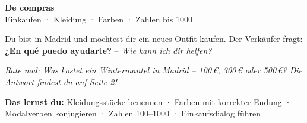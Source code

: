 \documentclass[11pt, a4paper]{article}
\newcommand{\seriftext}[1]{{\fontfamily{ppl}\selectfont #1}}
\newcommand{\es}[1]{\seriftext{\textbf{#1}}}
\newcommand{\de}[1]{\textit{\textcolor{akzent}{#1}}}
\begin{document}
\begin{center}
    {\LARGE\bfseries De compras}\\[3pt]
    {\small Einkaufen · Kleidung · Farben · Zahlen bis 1000}
\end{center}

\vspace{4pt}

Du bist in Madrid und möchtest dir ein neues Outfit kaufen.
Der Verkäufer fragt: \es{¿En qué puedo ayudarte?} -- \de{Wie kann ich dir helfen?}

{\small\textit{Rate mal: Was kostet ein Wintermantel in Madrid -- 100\,€, 300\,€ oder 500\,€?
Die Antwort findest du auf Seite 2!}}

\vspace{2pt}

\begin{lernzielbox}
\textbf{Das lernst du:}\quad
Kleidungsstücke benennen · Farben mit korrekter Endung · Modalverben konjugieren · Zahlen 100--1000 · Einkaufsdialog führen
\end{lernzielbox}

\end{document}
